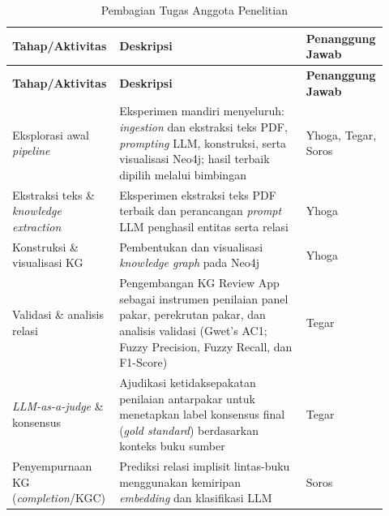 \documentclass[../../thesis]{subfiles}
\begin{document}
\begin{longtable}{@{}
  >{\raggedright\arraybackslash}p{0.27\linewidth}
  >{\raggedright\arraybackslash}p{0.49\linewidth}
  >{\raggedright\arraybackslash}p{0.16\linewidth}@{}}
\caption{Pembagian Tugas Anggota Penelitian}
\label{tab:pembagian-tugas}\\
\toprule
\textbf{Tahap/Aktivitas} & \textbf{Deskripsi} & \textbf{Penanggung Jawab} \\
\midrule
\endfirsthead
\toprule
\textbf{Tahap/Aktivitas} & \textbf{Deskripsi} & \textbf{Penanggung Jawab} \\
\midrule
\endhead
\bottomrule
\endlastfoot
Eksplorasi awal \textit{pipeline}
  & Eksperimen mandiri menyeluruh: \textit{ingestion} dan ekstraksi teks
    PDF, \textit{prompting} LLM, konstruksi, serta visualisasi Neo4j;
    hasil terbaik dipilih melalui bimbingan
  & Yhoga, Tegar, Soros \\
\addlinespace
Ekstraksi teks \& \textit{knowledge extraction}
  & Eksperimen ekstraksi teks PDF terbaik dan perancangan \textit{prompt}
    LLM penghasil entitas serta relasi
  & Yhoga \\
\addlinespace
Konstruksi \& visualisasi KG
  & Pembentukan dan visualisasi \textit{knowledge graph} pada Neo4j
  & Yhoga \\
\addlinespace
Validasi \& analisis relasi
  & Pengembangan KG Review App sebagai instrumen penilaian panel pakar,
    perekrutan pakar, dan analisis validasi (Gwet's AC1; Fuzzy
    Precision, Fuzzy Recall, dan F1-Score)
  & Tegar \\
\addlinespace
\textit{LLM-as-a-judge} \& konsensus
  & Ajudikasi ketidaksepakatan penilaian antarpakar untuk menetapkan
    label konsensus final (\textit{gold standard}) berdasarkan konteks
    buku sumber
  & Tegar \\
\addlinespace
Penyempurnaan KG (\textit{completion}/KGC)
  & Prediksi relasi implisit lintas-buku menggunakan kemiripan
    \textit{embedding} dan klasifikasi LLM
  & Soros \\
\end{longtable}
\end{document}
